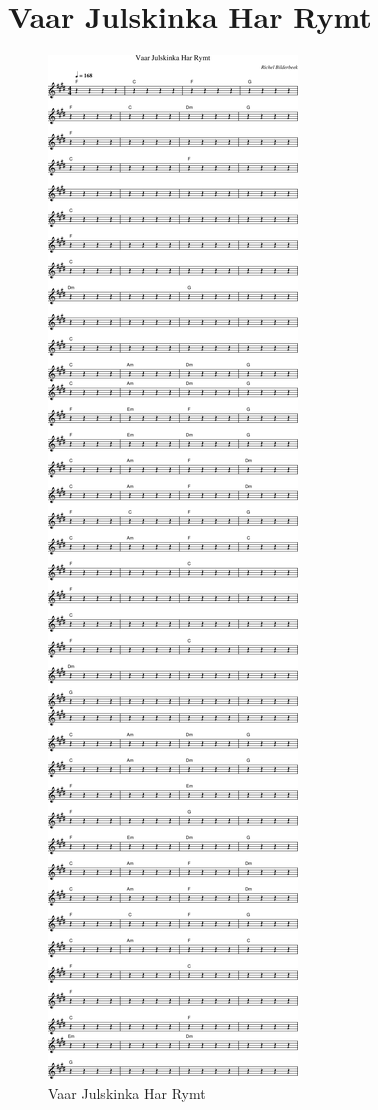 \section{Vaar Julskinka Har Rymt}



\begin{figure}[!htbp]
  \includegraphics[width=\textwidth,height=\textheight,keepaspectratio]{../songs/xx_vaar_julskinka_har_rymt.png}
  \caption{Vaar Julskinka Har Rymt}
  \label{fig:xx_vaar_julskinka_har_rymt}
\end{figure}
